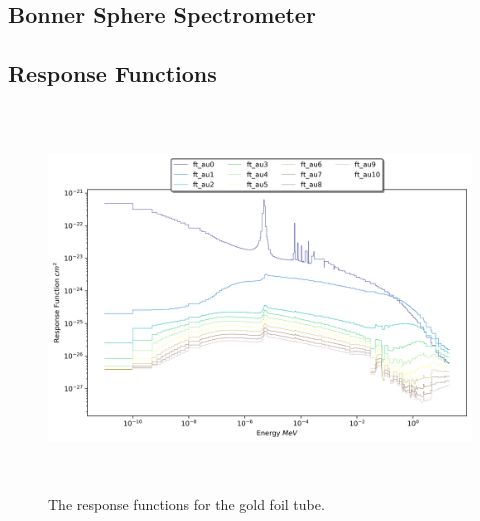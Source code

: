 
\subsection{Bonner Sphere Spectrometer}


%






\subsection{Response Functions}



\begin{figure}[htb]
\centering
\includegraphics[height=4in]{tex/figures/ft_au.png}
\caption[Gold Foil Tube Response Functions]{The response functions for the gold foil tube.}
\label{fig:ft_au_rfs}
\end{figure}

